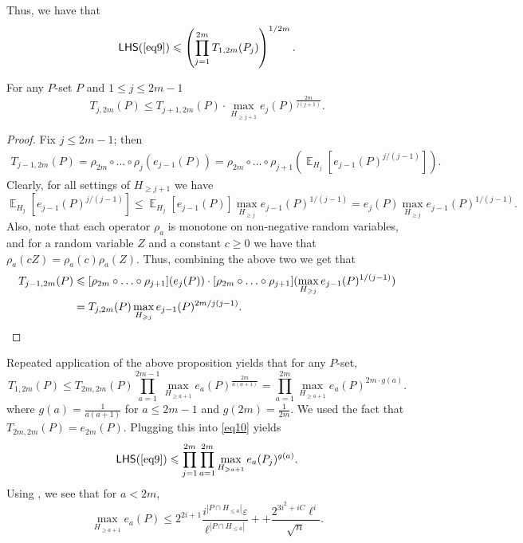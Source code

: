 \documentclass{toc}
\newcommand\card[1]{\left| {#1} \right|}
\newcommand\Expect[2]{{\mathop{\mathbb{E}}_{#1}\left[ {#2} \right]}}
\newcommand\eps{\varepsilon}
\renewcommand\geq{\geqslant}
\renewcommand\leq{\leqslant}
\begin{document}
Thus, we have that
\begin{equation}\label{eq10}
  {\sf LHS}(\ref{eq9})\leq \left(\prod\limits_{j=1}^{2m}{T_{1,2m}(P_j)}\right)^{1/2m}.
\end{equation}

\begin{proposition}
For any $P$-set $P$ and $1\leq j\leq 2m-1$
\[
T_{j,2m}(P)
\leq T_{j+1,2m}(P)\cdot \max_{H_{\geq j+1}}{e_{j}(P)^{\frac{2m}{j(j+1)}}}.
\]
\end{proposition}
\begin{proof}
Fix $j\leq 2m-1$; then
\begin{align*}
T_{j-1,2m}(P)
 = \rho_{2m}\circ\ldots\circ\rho_{j}\left(e_{j-1}(P)\right)
 = \rho_{2m}\circ\ldots\circ\rho_{j+1}\left(\Expect{H_{j}}{e_{j-1}(P)^{j/(j-1)}}\right).
\end{align*}
Clearly, for all settings of $H_{\geq j+1}$ we have
\[
\Expect{H_{j}}{e_{j-1}(P)^{j/(j-1)}}
\leq \Expect{H_{j}}{e_{j-1}(P)} \max_{H_{\geq j}}{e_{j-1}(P)^{1/(j-1)}}
=e_j(P)\max_{H_{\geq j}}{e_{j-1}(P)^{1/(j-1)}}.
\]
Also, note that each operator $\rho_a$ is monotone on non-negative random variables, and
for a random variable $Z$ and a constant $c\geq 0$ we have that $\rho_a(cZ) = \rho_a(c) \rho_a(Z)$.
Thus, combining the above two we get that
\begin{align*}
T_{j-1,2m}(P)
&\leq
[\rho_{2m}\circ\ldots\circ\rho_{j+1}](e_j(P))\cdot
[\rho_{2m}\circ\ldots\circ\rho_{j+1}](\max_{H_{\geq j}}{e_{j-1}(P)^{1/(j-1)}})\\
&= T_{j,2m}(P) \max_{H_{\geq j}}{e_{j-1}(P)^{2m/j(j-1)}}.
\qedhere %
\end{align*}
\end{proof}
Repeated application of the above proposition yields that for any $P$-set,
\[
T_{1,2m}(P)
\leq
T_{2m,2m}(P)\prod\limits_{a=1}^{2m-1}{\max_{H_{\geq a+1}}{e_{a}(P)^{\frac{2m}{a(a+1)}}}}
=\prod\limits_{a=1}^{2m}{\max_{H_{\geq a+1}}{e_{a}(P)^{2m \cdot g(a)}}}.
\]
where $g(a) = \frac{1}{a(a+1)}$ for $a\leq 2m-1$ and $g(2m) = \frac{1}{2m}$. We used the fact that $T_{2m,2m}(P) = e_{2m}(P)$.
Plugging this into \eqref{eq10} yields
\begin{equation}\label{eq10'}
{\sf LHS}(\ref{eq9})\leq \prod\limits_{j=1}^{2m}{\prod\limits_{a=1}^{2m}{\max_{H_{\geq a+1}}{e_{a}(P_j)^{g(a)}}}}.
\end{equation}
Using , we see that for $a<2m$,
\[
\max_{H_{\geq a+1}} e_a(P)
\leq 2^{2i+1}\frac{i^{\card{P\cap H_{\leq a}}} \eps}{\ell^{\card{P\cap H_{\leq a}}}} +
+\frac{2^{3i^2+iC} \ell^{i}}{\sqrt{n}}.
\]
\end{document}
